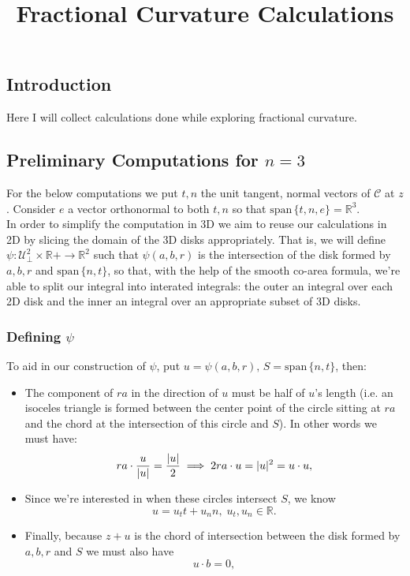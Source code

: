 \documentclass{article}
\title{Fractional Curvature Calculations}
\begin{document}
\subsection{Introduction} Here I will collect calculations done while exploring fractional curvature.

\subsection{Preliminary Computations for $n=3$}

For the below computations we put $t, n$ the unit tangent, normal vectors of $\mathcal{C}$ at $z$. Consider $e$ a vector orthonormal to both $t, n$ so that $\textrm{span}\,\{t,n,e\} = \mathbb{R}^3$. \\

In order to simplify the computation in 3D we aim to reuse our calculations in 2D by slicing the domain of the 3D disks appropriately. That is, we will define $\psi : \mathcal{U}_\perp^2 \times \mathbb{R}+ \to \mathbb{R}^2$ such that $\psi(a, b, r)$ is the intersection of the disk formed by $a, b, r$ and $\textrm{span}\,\{n, t\}$, so that, with the help of the smooth co-area formula, we're able to split our integral into interated integrals: the outer an integral over each 2D disk and the inner an integral over an appropriate subset of 3D disks. \\

\subsubsection{Defining $\psi$}
To aid in our construction of $\psi$, put $u = \psi(a, b, r), \, S = \mathrm{span} \, \{n, t\}$, then:
\begin{itemize}
  \item The component of $ra$ in the direction of $u$ must be half of $u$'s length (i.e. an isoceles triangle is formed between the center point of the circle sitting at $ra$ and the chord at the intersection of this circle and $S$). In other words we must have:
    \begin{equation}
      ra \cdot \frac{u}{\lvert u\rvert} = \frac{\lvert u\rvert}{2} \implies 2 ra \cdot u = \lvert u\rvert^2 = u\cdot u, \label{c1}
    \end{equation}
  \item Since we're interested in when these circles intersect $S$, we know
    \begin{equation}
      u = u_t t + u_n n, \; u_t, u_n \in \mathbb{R}. \label{c3}
    \end{equation}
  \item Finally, because $z + u$ is the chord of intersection between the disk formed by $a, b, r$ and $S$ we must also have
    \begin{equation}
      u \cdot b = 0, \label{c2}
    \end{equation}
\end{itemize}
\end{document}
